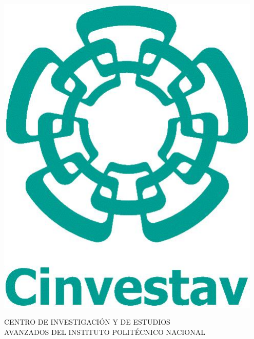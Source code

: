 \thispagestyle{empty}
\begin{minipage}{0.15\textwidth}
\includegraphics[width=0.95\textwidth]{img/logo-al.jpg}
\end{minipage}
\begin{minipage}{0.87\textwidth}
\begin{center}
\sc CENTRO DE INVESTIGACI\'{O}N Y DE ESTUDIOS \\ AVANZADOS DEL INSTITUTO POLIT\'{E}CNICO NACIONAL
\end{center}
\end{minipage}

